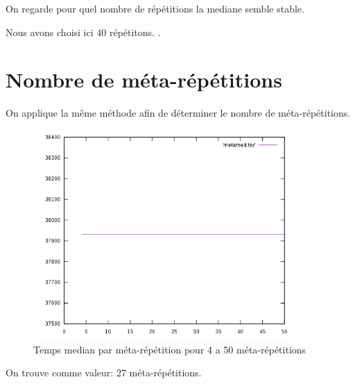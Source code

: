 \documentclass[a4paper]{report}
\begin{document}
On regarde pour quel nombre de répétitions la mediane semble stable.

Nous avons choisi ici 40 répétitons.
\newpage.
\section*{Nombre de méta-répétitions}
On applique la même méthode afin de déterminer le nombre de méta-répétitions.
\begin{figure}[ht!]
    \centering
    \includegraphics[width=100mm]{MEDIA/metamed.png}
    \caption{Temps median par méta-répétition pour 4 a 50 méta-répétitions}
\end{figure}
On trouve comme valeur: 27 méta-répétitions.
\newpage






\end{document}
